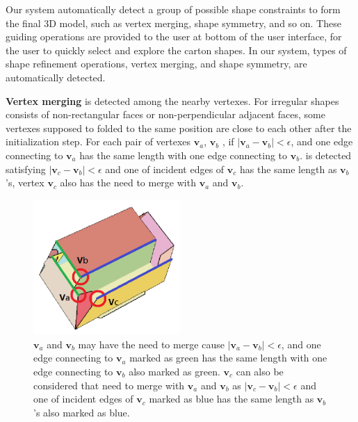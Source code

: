 Our system  automatically detect a group of possible shape constraints to form the final 3D model, such as vertex merging, shape symmetry, and so on. 
%
These guiding operations are provided to the user at bottom of the user interface, for the user to quickly select and explore the carton shapes.
In our system,  types of shape refinement operations, vertex merging, and shape symmetry, are automatically detected.

%

\noindent
\textbf{Vertex merging} is detected among the nearby vertexes. 
For irregular shapes consists of non-rectangular faces or non-perpendicular adjacent faces, some vertexes supposed to folded to the same position are close to each other after the initialization step. 
For each pair of vertexes $\mathbf{v}_a$, $\mathbf{v}_b$ {\color{blue}{that in the nonadjacent face}}, if $|\mathbf{v}_a-\mathbf{v}_b|<\epsilon$, and one edge connecting to $\mathbf{v}_a$ has the same length with one edge connecting to $\mathbf{v}_b$.
{ is detected satisfying $|\mathbf{v}_c-\mathbf{v}_b|<\epsilon$ and one of incident edges of $\mathbf{v}_c$ has the same length as $\mathbf{v}_b$'s, vertex $\mathbf{v}_c$ also has the need to merge with $\mathbf{v}_a$ and $\mathbf{v}_b$.}

\begin{figure}
	\centering
	\includegraphics[width=0.5\textwidth]{images/vertexMerging.png}
	\caption{$\mathbf{v}_a$ and $\mathbf{v}_b$ may have the need to merge cause $|\mathbf{v}_a-\mathbf{v}_b|<\epsilon$, and one edge connecting to $\mathbf{v}_a$ marked as green has the same length with one edge connecting to $\mathbf{v}_b$ also marked as green. $\mathbf{v}_c$ can also be considered that need to merge with $\mathbf{v}_a$ and $\mathbf{v}_b$ as $|\mathbf{v}_c-\mathbf{v}_b|<\epsilon$ and one of incident edges of $\mathbf{v}_c$ marked as blue has the same length as $\mathbf{v}_b$'s also marked as blue.}
	\label{fig:vertexMerging}
\end{figure}

